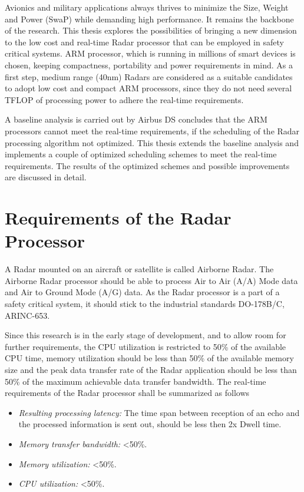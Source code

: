 Avionics and military applications always thrives to minimize the Size, Weight and Power (SwaP) while demanding high performance. It remains the backbone of the research. This thesis explores the possibilities of bringing a new dimension to the low cost and real-time Radar processor that can be employed in safety critical systems. ARM processor, which is running in millions of smart devices\cite{armWeb} is chosen, keeping compactness, portability and power requirements in mind. As a first step, medium range (40nm) Radars are considered as a suitable candidates to adopt low cost and compact ARM processors, since they do not need several TFLOP of processing power to adhere the real-time requirements.

A baseline analysis is carried out by Airbus DS concludes that the ARM processors cannot meet the real-time requirements, if the scheduling of the Radar processing algorithm not optimized. This thesis extends the baseline analysis and implements a couple of optimized scheduling schemes to meet the real-time requirements. The results of the optimized schemes and possible improvements are discussed in detail.

\section{Requirements of the Radar Processor}
\label{sec:intro:realtime_req}
A Radar mounted on an aircraft or satellite is called Airborne Radar. The Airborne Radar processor should be able to process Air to Air (A/A) Mode data and Air to Ground Mode (A/G) data. As the Radar processor is a part of a safety critical system, it should stick to the industrial standards DO-178B/C, ARINC-653.

Since this research is in the early stage of development, and to allow room for further requirements, the CPU utilization is restricted to 50\% of the available CPU time, memory utilization should be less than 50\% of the available memory size and the peak data transfer rate of the Radar application should be less than 50\% of the maximum achievable data transfer bandwidth. The real-time requirements of the Radar processor shall be summarized as follows
\begin{itemize}
        \itemsep0em
        \item \textit{Resulting processing latency:} The time span between reception of an echo and the processed information is sent out, should be less then 2x Dwell time.
        \item \textit{Memory transfer bandwidth:} <50\%.
        \item \textit{Memory utilization:} <50\%.
        \item \textit{CPU utilization:} <50\%.
\end{itemize}


